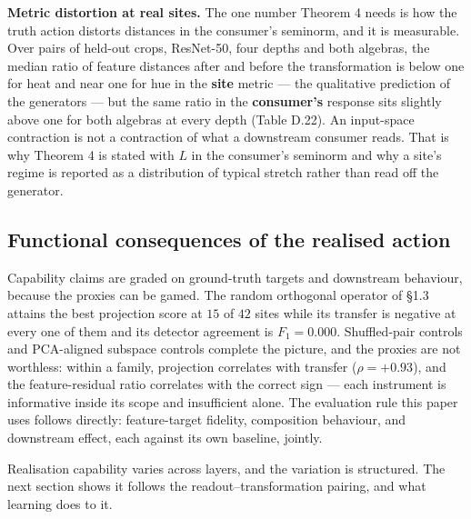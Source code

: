 \textbf{Metric distortion at real sites.} The one number Theorem 4 needs is how the truth action distorts distances in the consumer's seminorm, and it is measurable. Over pairs of held-out crops, ResNet-50, four depths and both algebras, the median ratio of feature distances after and before the transformation is below one for heat and near one for hue in the \textbf{site} metric --- the qualitative prediction of the generators --- but the same ratio in the \textbf{consumer's} response sits slightly above one for both algebras at every depth (Table D.22). An input-space contraction is not a contraction of what a downstream consumer reads. That is why Theorem 4 is stated with $L$ in the consumer's seminorm and why a site's regime is reported as a distribution of typical stretch rather than read off the generator.

\subsection{Functional consequences of the realised action}

Capability claims are graded on ground-truth targets and downstream behaviour, because the proxies can be gamed. The random orthogonal operator of \S{}1.3 attains the best projection score at $15$ of $42$ sites while its transfer is negative at every one of them and its detector agreement is $F_1=0.000$. Shuffled-pair controls and PCA-aligned subspace controls complete the picture, and the proxies are not worthless: within a family, projection correlates with transfer ($\rho=+0.93$), and the feature-residual ratio correlates with the correct sign --- each instrument is informative inside its scope and insufficient alone. The evaluation rule this paper uses follows directly: feature-target fidelity, composition behaviour, and downstream effect, each against its own baseline, jointly.

Realisation capability varies across layers, and the variation is structured. The next section shows it follows the readout--transformation pairing, and what learning does to it.

